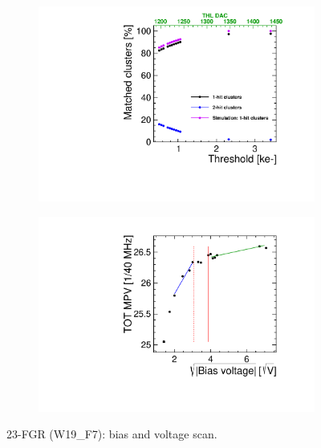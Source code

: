 \begin{figure}[htbp] \centering
  \begin{subfigure}[b]{0.45\textwidth}
    \includegraphics[width=\textwidth]{./figures/TestBeam/ThresholdScan_W0019_F07.pdf}
    \caption{}
  \end{subfigure} \hfill
  \begin{subfigure}[b]{0.45\textwidth}
    \includegraphics[width=\textwidth]{./figures/TestBeam/depletionVoltage_W0019_F07.pdf}
    \caption{}
  \end{subfigure}
  \caption{23-FGR (W19\_F7): bias and voltage scan.}
  \label{fig:Timepix3_THLscan_Vdep_F7}
\end{figure}

